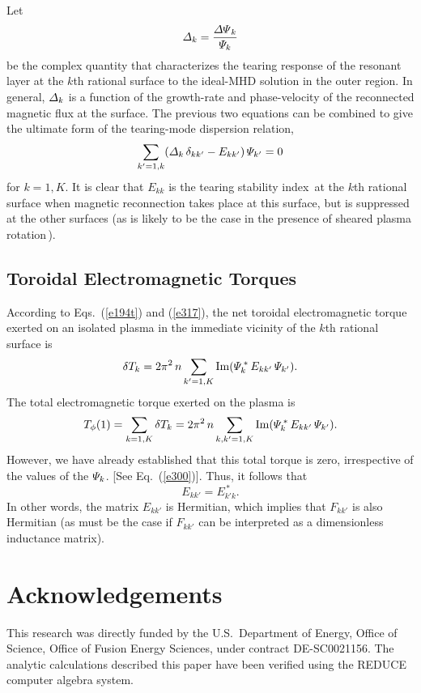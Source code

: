 \documentclass[12pt,prb,aps]{revtex4-1}
\begin{document}
Let
\begin{equation}\label{e403}
{\mit\Delta}_k = \frac{{\mit\Delta\Psi}_k}{{\mit\Psi}_k}
\end{equation}
 be the complex quantity that characterizes the
tearing response of the resonant layer at the $k$th rational surface to the ideal-MHD solution in the outer region.\cite{fkr}
In general, ${\mit\Delta}_k$ is a function of the growth-rate and phase-velocity of the reconnected magnetic flux at the surface.\cite{am1,layer,layer1}
The previous two equations can be combined to give the ultimate form of the  tearing-mode dispersion relation,
\begin{equation}
\sum_{k'=1,k}({\mit\Delta}_k\,\delta_{kk'}-E_{kk'})\,{\mit\Psi}_{k'} = 0
\end{equation}
for $k=1,K$. It is clear that $E_{kk}$ is the tearing stability index\,\cite{fkr} at the $k$th rational surface when magnetic reconnection  takes place
at this surface, but is suppressed at the other surfaces (as is likely to be the case in the presence of sheared plasma rotation\,\cite{am1}). 

\subsection{Toroidal Electromagnetic Torques}
According to Eqs.~(\ref{e194t}) and (\ref{e317}), the net toroidal electromagnetic torque exerted on an isolated plasma
in the immediate vicinity of the $k$th rational surface is
\begin{equation}\label{e405}
\delta T_k = 2\pi^2\,n\sum_{k'=1,K} {\rm Im}({\mit\Psi}_k^{\,\ast}\,E_{kk'}\,{\mit\Psi}_{k'}).
\end{equation}
The total electromagnetic torque exerted on the plasma is
\begin{equation}
T_\phi(1) = \sum_{k=1,K}\delta T_k =  2\pi^2\,n\sum_{k,k'=1,K} {\rm Im}({\mit\Psi}_k^{\,\ast}\,E_{kk'}\,{\mit\Psi}_{k'}).
\end{equation}
However, we have already established that this total torque is zero, irrespective of the values of the ${\mit\Psi}_k$. [See Eq.~(\ref{e300})].
Thus, it follows that
\begin{equation}
E_{kk'} = E_{k'k}^{\,\ast}.
\end{equation}
In other words, the matrix $E_{kk'}$ is Hermitian,\cite{am1} which implies that $F_{kk'}$ is also Hermitian (as must  be the case if $F_{kk'}$ can
be interpreted as 
a dimensionless inductance matrix). 


\section*{Acknowledgements}
This research was directly funded by the U.S.\ Department of Energy, Office of Science, Office of Fusion Energy Sciences, under  contract DE-SC0021156. 
The analytic calculations  described  this paper have been verified using the {\sc REDUCE} computer algebra system.
\end{document}
